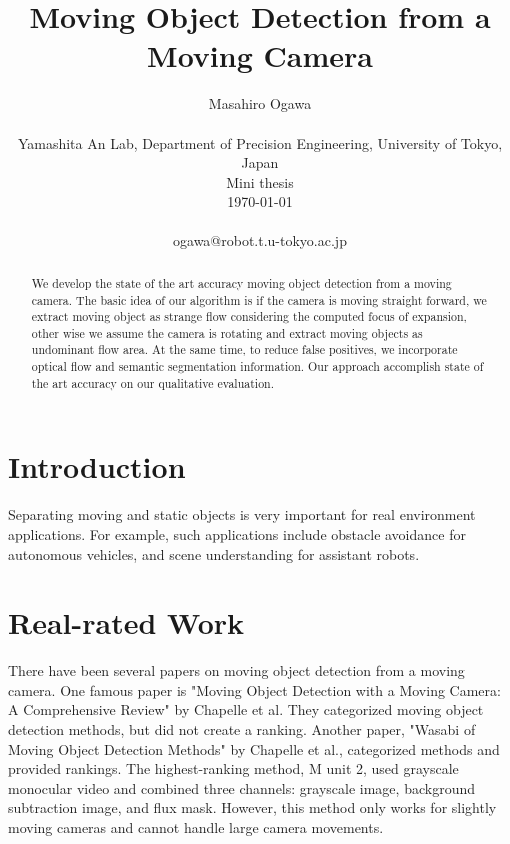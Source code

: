 \documentclass[10pt, twocolumn]{article}
\begin{document}
\title{Moving Object Detection from a Moving Camera}

\author{Masahiro Ogawa \\
  \\
  Yamashita An Lab,
  Department of Precision Engineering,
  University of Tokyo, Japan\\
  Mini thesis\\
  \today
  \\
  \\
  ogawa@robot.t.u-tokyo.ac.jp}

\maketitle
\thispagestyle{empty}

\begin{abstract}
  We develop the state of the art accuracy moving object detection from a moving camera.
  The basic idea of our algorithm is if the camera is moving straight forward, we extract moving object as strange flow considering the computed focus of expansion, other wise we assume the camera is rotating and extract moving objects as undominant flow area. At the same time, to reduce false positives, we incorporate optical flow and semantic segmentation information.
  Our approach accomplish state of the art accuracy on our qualitative evaluation.
\end{abstract}


\section{Introduction}
Separating moving and static objects is very important for real environment applications.
For example, such applications include obstacle avoidance for autonomous vehicles, and scene understanding for assistant robots.


\section{Real-rated Work}
There have been several papers on moving object detection from a moving camera.
One famous paper is "Moving Object Detection with a Moving Camera: A Comprehensive Review" by Chapelle et al\cite{chapel2020moving}. They categorized moving object detection methods, but did not create a ranking. Another paper, "Wasabi of Moving Object Detection Methods" by Chapelle et al., categorized methods and provided rankings. The highest-ranking method, M unit 2, used grayscale monocular video and combined three channels: grayscale image, background subtraction image, and flux mask. However, this method only works for slightly moving cameras and cannot handle large camera movements.
\end{document}
